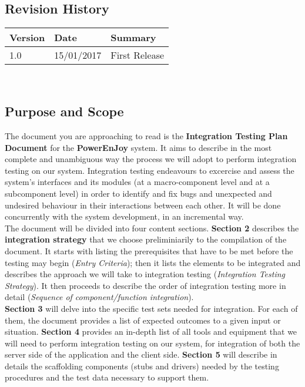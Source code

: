 \subsection{Revision History}
	\begin{tabular}{ |l|l|l| }
		\hline
		Version & Date & Summary\\ \hline
		1.0 & 15/01/2017 & First Release\\ \hline
	\end{tabular}
	\\

\subsection{Purpose and Scope}
	The document you are approaching to read is the \textbf{Integration Testing Plan Document} for the \textbf{PowerEnJoy} system. It aims to describe in the most complete and unambiguous way the process we will adopt to perform integration testing on our system. Integration testing endeavours to excercise and assess the system's interfaces and its modules (at a macro-component level and at a subcomponent level) in order to identify and fix bugs and unexpected and undesired behaviour in their interactions between each other. It will be done concurrently with the system development, in an incremental way.\\
	The document will be divided into four content sections. \textbf{Section 2} describes the \textbf{integration strategy} that we choose preliminiarily to the compilation of the document. It starts with listing the prerequisites that have to be met before the testing may begin (\textit{Entry Criteria}); then it lists the elements to be integrated and describes the approach we will take to integration testing (\textit{Integration Testing Strategy}). It then proceeds to describe the order of integration testing more in detail (\textit{Sequence of component/function integration}).\\
	\textbf{Section 3} will delve into the specific test sets needed for integration. For each of them, the document provides a list of expected outcomes to a given input or situation. \textbf{Section 4} provides an in-depth list of all tools and equipment that we will need to perform integration testing on our system, for integration of both the server side of the application and the client side. \textbf{Section 5} will describe in details the scaffolding components (stubs and drivers) needed by the testing procedures and the test data necessary to support them.


